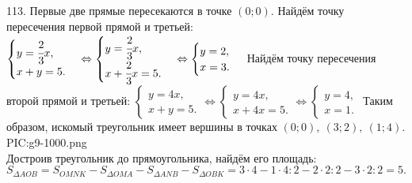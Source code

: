 113. Первые две прямые пересекаются в точке $(0;0).$ Найдём точку пересечения первой прямой и третьей: $\begin{cases}y=\cfrac{2}{3}x,\\ x+y=5.\end{cases}
\Leftrightarrow \begin{cases}y=\cfrac{2}{3}x,\\ x+\cfrac{2}{3}x=5.\end{cases}
\Leftrightarrow \begin{cases}y=2,\\ x=3.\end{cases}$ Найдём точку пересечения второй прямой и третьей: $\begin{cases}y=4x,\\ x+y=5.\end{cases}
\Leftrightarrow \begin{cases}y=4x,\\ x+4x=5.\end{cases}
\Leftrightarrow \begin{cases}y=4,\\ x=1.\end{cases}$ Таким образом, искомый треугольник имеет вершины в точках $(0;0),\ (3;2),\ (1;4).$\\
{{PIC:g9-1000.png}}\\
Достроив треугольник до прямоугольника, найдём его площадь: $S_{\Delta AOB}=S_{OMNK}-S_{\Delta OMA}-S_{\Delta ANB}-S_{\Delta OBK}=
3\cdot4-1\cdot4:2-2\cdot2:2-3\cdot2:2=5.$\\
